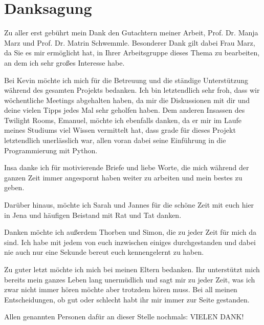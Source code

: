 \chapter*{Danksagung}

Zu aller erst gebührt mein Dank den Gutachtern meiner Arbeit, Prof. Dr. Manja Marz und Prof. Dr. Matrin Schwemmle. Besonderer Dank gilt dabei Frau Marz, da Sie es mir ermöglicht hat, in Ihrer Arbeitsgruppe dieses Thema zu bearbeiten, an dem ich sehr großes Interesse habe.

\vspace{1em}

Bei Kevin möchte ich mich für die Betreuung und die ständige Unterstützung während des gesamten Projekts bedanken. Ich bin letztendlich sehr froh, dass wir wöchentliche Meetings abgehalten haben, da mir die Diskussionen mit dir und deine vielen Tipps jedes Mal sehr geholfen haben. Dem anderen Insassen des Twilight Rooms, Emanuel, möchte ich ebenfalls danken, da er mir im Laufe meines Studiums viel Wissen vermittelt hat, dass grade für dieses Projekt letztendlich unerlässlich war, allen voran dabei seine Einführung in die Programmierung mit Python.

\vspace{1em}

Insa danke ich für motivierende Briefe und liebe Worte, die mich während der ganzen Zeit immer angespornt haben weiter zu arbeiten und mein bestes zu geben. 

\vspace{1em}

Darüber hinaus, möchte ich Sarah und Jannes für die schöne Zeit mit euch hier in Jena und häufigen Beistand mit Rat und Tat danken. 

\vspace{1em}

Danken möchte ich außerdem Thorben und Simon, die zu jeder Zeit für mich da sind. Ich habe mit jedem von euch inzwischen einiges durchgestanden und dabei nie auch nur eine Sekunde bereut euch kennengelernt zu haben. %

\vspace{1em}

Zu guter letzt möchte ich mich bei meinen Eltern bedanken. Ihr unterstützt mich bereits mein ganzes Leben lang unermüdlich und sagt mir zu jeder Zeit, was ich zwar nicht immer hören möchte aber trotzdem hören muss. Bei all meinen Entscheidungen, ob gut oder schlecht habt ihr mir immer zur Seite gestanden. 

\vspace{1em}

Allen genannten Personen dafür an dieser Stelle nochmals: VIELEN DANK!
